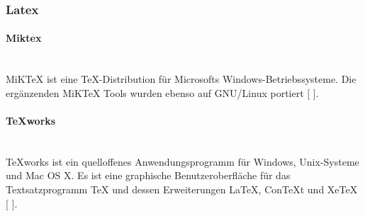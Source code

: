 \documentclass[FIPLY_base.tex]{subfiles}
\begin{document}
\subsubsection{Latex}
\paragraph{Miktex}\ \\
MiKTeX ist eine TeX-Distribution für Microsofts Windows-Betriebssysteme. Die ergänzenden MiKTeX Tools wurden ebenso auf GNU/Linux portiert [ \cite{lxMiktex}].

\paragraph{TeXworks}\ \\
TeXworks ist ein quelloffenes Anwendungsprogramm für Windows, Unix-Systeme und Mac OS X. Es ist eine graphische Benutzeroberfläche für das Textsatzprogramm TeX und dessen Erweiterungen LaTeX, ConTeXt und XeTeX [ \cite{lxTexworks}].
\end{document}
